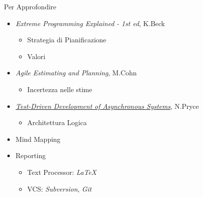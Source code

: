\documentclass[compress, red, 14pt]{beamer}
\newcommand{\highlight}[1]{{\color{purple} \emph{#1}}}
\begin{document}
	\begin{frame}{Per Approfondire}
		\begin{itemize}
			\item {\small \highlight{Extreme Programming Explained - 1st ed}, K.Beck}
			\begin{itemize}
				\item Strategia di Pianificazione
				\item Valori
			\end{itemize}
			
			\item {\small \highlight{Agile Estimating and Planning}, M.Cohn}
			\begin{itemize}
				\item Incertezza nelle stime
			\end{itemize}
			
			\item {\footnotesize \highlight{\href{http://www.natpryce.com/articles/000755.html}{Test-Driven Development of Asynchronous Systems}}}{\small , N.Pryce}
				\begin{itemize}
					\item Architettura Logica
				\end{itemize}
		\end{itemize}
		
		\begin{itemize}
			\item Mind Mapping
			\item Reporting
			\begin{itemize}
				\item Text Processor: \highlight{LaTeX}
				\item VCS: \highlight{Subversion}, \highlight{Git}
			\end{itemize}
		\end{itemize}
	\end{frame}
\end{document}
